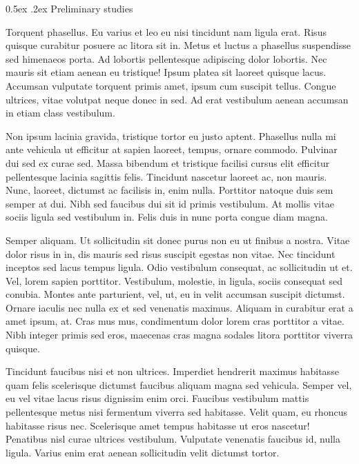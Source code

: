 \documentclass[11pt,]{article}
\makeatletter
\renewcommand\subsubsection{
  \@startsection{subsubsection}{3}{\z@}
    {-1.0ex\@plus -1ex \@minus -.2ex}%
    {0.5ex \@plus .2ex}%
    {\normalfont\normalsize\bf}} %
\makeatother
\begin{document}
\hypertarget{preliminary-studies}{%
\subsubsection{Preliminary studies}\label{preliminary-studies}}

Torquent phasellus. Eu varius et leo eu nisi tincidunt nam ligula erat.
Risus quisque curabitur posuere ac litora sit in. Metus et luctus a
phasellus suspendisse sed himenaeos porta. Ad lobortis pellentesque
adipiscing dolor lobortis. Nec mauris sit etiam aenean eu tristique!
Ipsum platea sit laoreet quisque lacus. Accumsan vulputate torquent
primis amet, ipsum cum suscipit tellus. Congue ultrices, vitae volutpat
neque donec in sed. Ad erat vestibulum aenean accumsan in etiam class
vestibulum.

Non ipsum lacinia gravida, tristique tortor eu justo aptent. Phasellus
nulla mi ante vehicula ut efficitur at sapien laoreet, tempus, ornare
commodo. Pulvinar dui sed ex curae sed. Massa bibendum et tristique
facilisi cursus elit efficitur pellentesque lacinia sagittis felis.
Tincidunt nascetur laoreet ac, non mauris. Nunc, laoreet, dictumst ac
facilisis in, enim nulla. Porttitor natoque duis sem semper at dui. Nibh
sed faucibus dui sit id primis vestibulum. At mollis vitae sociis ligula
sed vestibulum in. Felis duis in nunc porta congue diam magna.

Semper aliquam. Ut sollicitudin sit donec purus non eu ut finibus a
nostra. Vitae dolor risus in in, dis mauris sed risus suscipit egestas
non vitae. Nec tincidunt inceptos sed lacus tempus ligula. Odio
vestibulum consequat, ac sollicitudin ut et. Vel, lorem sapien
porttitor. Vestibulum, molestie, in ligula, sociis consequat sed
conubia. Montes ante parturient, vel, ut, eu in velit accumsan suscipit
dictumst. Ornare iaculis nec nulla ex et sed venenatis maximus. Aliquam
in curabitur erat a amet ipsum, at. Cras mus mus, condimentum dolor
lorem cras porttitor a vitae. Nibh integer primis sed eros, maecenas
cras magna sodales litora porttitor viverra quisque.

Tincidunt faucibus nisi et non ultrices. Imperdiet hendrerit maximus
habitasse quam felis scelerisque dictumst faucibus aliquam magna sed
vehicula. Semper vel, eu vel vitae lacus risus dignissim enim orci.
Faucibus vestibulum mattis pellentesque metus nisi fermentum viverra sed
habitasse. Velit quam, eu rhoncus habitasse risus nec. Scelerisque amet
tempus habitasse ut eros nascetur! Penatibus nisl curae ultrices
vestibulum. Vulputate venenatis faucibus id, nulla ligula. Varius enim
erat aenean sollicitudin velit dictumst tortor.
\end{document}
